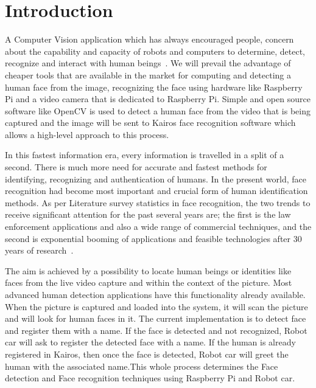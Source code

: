 
\maketitle

\section{Introduction}
A Computer Vision application which has always encouraged people, concern 
about the capability and capacity of robots and computers to determine, 
detect, recognize and interact with human beings~\cite{Boris2014}. We will 
prevail the advantage of cheaper tools that are available in the market for 
computing and detecting a human face from the image, recognizing the face 
using hardware like Raspberry Pi and a video camera that is dedicated to 
Raspberry Pi. Simple and open source software like OpenCV is used to detect 
a human face from the video that is being captured and the image will be 
sent to Kairos face recognition software which allows a high-level approach 
to this process.

In this fastest information era, every information is travelled in a split 
of a second. There is much more need for accurate and fastest methods for 
identifying, recognizing and authentication of humans. In the present world, 
face recognition had become most important and crucial form of human 
identification methods. As per Literature survey statistics in face 
recognition, the two trends to receive significant attention for the past 
several years are; the first is the law enforcement applications and also a 
wide range of commercial techniques, and the second is exponential booming 
of applications and feasible technologies after 30 years of 
research~\cite{riddhi2013}.

The aim is achieved by a possibility to locate human beings or identities 
like faces from the live video capture and within the context of the picture. 
Most advanced human detection applications have this functionality already 
available. When the picture is captured and loaded into the system, it will 
scan the picture and will look for human faces in it. The current 
implementation is to detect face and register them with a name.
If the face is detected and not recognized, Robot car will ask to register 
the detected face with a name. If the human is already registered in Kairos, 
then once the face is detected, Robot car will greet the human with the 
associated name.This whole process determines the Face detection and Face 
recognition techniques using Raspberry Pi and Robot car.

